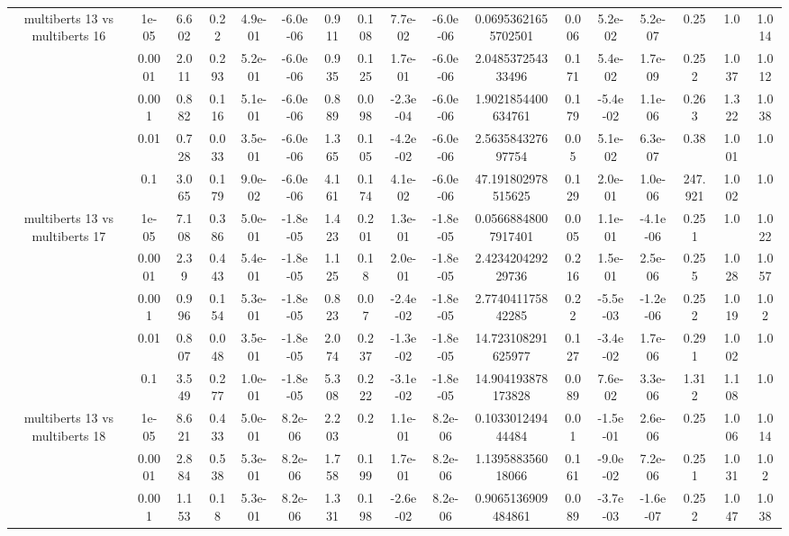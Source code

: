 \begin{tabular}{|c|c|c|c|c|c|c|c|c|c|c|c|c|c|c|c|c|}
\hline
\multirow{5}{*}{multiberts 13 vs multiberts 16} & 1e-05 & 6.602 & 0.22 & 4.9e-01 & -6.0e-06 & 0.911 & 0.108 & 7.7e-02 & -6.0e-06 & 0.06953621655702501 & 0.006 & 5.2e-02 & 5.2e-07 & 0.25 & 1.0 & 1.014 \\
 & 0.0001 & 2.011 & 0.293 & 5.2e-01 & -6.0e-06 & 0.935 & 0.125 & 1.7e-01 & -6.0e-06 & 2.048537254333496 & 0.171 & 5.4e-02 & 1.7e-09 & 0.252 & 1.037 & 1.012 \\
 & 0.001 & 0.882 & 0.116 & 5.1e-01 & -6.0e-06 & 0.889 & 0.098 & -2.3e-04 & -6.0e-06 & 1.9021854400634761 & 0.179 & -5.4e-02 & 1.1e-06 & 0.263 & 1.322 & 1.038 \\
 & 0.01 & 0.728 & 0.033 & 3.5e-01 & -6.0e-06 & 1.365 & 0.105 & -4.2e-02 & -6.0e-06 & 2.563584327697754 & 0.05 & 5.1e-02 & 6.3e-07 & 0.38 & 1.001 & 1.0 \\
 & 0.1 & 3.065 & 0.179 & 9.0e-02 & -6.0e-06 & 4.161 & 0.174 & 4.1e-02 & -6.0e-06 & 47.191802978515625 & 0.129 & 2.0e-01 & 1.0e-06 & 247.921 & 1.002 & 1.0 \\
\hline
\multirow{5}{*}{multiberts 13 vs multiberts 17} & 1e-05 & 7.108 & 0.386 & 5.0e-01 & -1.8e-05 & 1.423 & 0.201 & 1.3e-01 & -1.8e-05 & 0.05668848007917401 & 0.005 & 1.1e-01 & -4.1e-06 & 0.251 & 1.0 & 1.022 \\
 & 0.0001 & 2.39 & 0.443 & 5.4e-01 & -1.8e-05 & 1.125 & 0.18 & 2.0e-01 & -1.8e-05 & 2.423420429229736 & 0.216 & 1.5e-01 & 2.5e-06 & 0.255 & 1.028 & 1.057 \\
 & 0.001 & 0.996 & 0.154 & 5.3e-01 & -1.8e-05 & 0.823 & 0.07 & -2.4e-02 & -1.8e-05 & 2.774041175842285 & 0.22 & -5.5e-03 & -1.2e-06 & 0.252 & 1.019 & 1.02 \\
 & 0.01 & 0.807 & 0.048 & 3.5e-01 & -1.8e-05 & 2.074 & 0.237 & -1.3e-02 & -1.8e-05 & 14.723108291625977 & 0.127 & -3.4e-02 & 1.7e-06 & 0.291 & 1.002 & 1.0 \\
 & 0.1 & 3.549 & 0.277 & 1.0e-01 & -1.8e-05 & 5.308 & 0.222 & -3.1e-02 & -1.8e-05 & 14.904193878173828 & 0.089 & 7.6e-02 & 3.3e-06 & 1.312 & 1.108 & 1.0 \\
\hline
\multirow{5}{*}{multiberts 13 vs multiberts 18} & 1e-05 & 8.621 & 0.433 & 5.0e-01 & 8.2e-06 & 2.203 & 0.2 & 1.1e-01 & 8.2e-06 & 0.103301249444484 & 0.01 & -1.5e-01 & 2.6e-06 & 0.25 & 1.006 & 1.014 \\
 & 0.0001 & 2.884 & 0.538 & 5.3e-01 & 8.2e-06 & 1.758 & 0.199 & 1.7e-01 & 8.2e-06 & 1.139588356018066 & 0.161 & -9.0e-02 & 7.2e-06 & 0.251 & 1.031 & 1.02 \\
 & 0.001 & 1.153 & 0.18 & 5.3e-01 & 8.2e-06 & 1.331 & 0.198 & -2.6e-02 & 8.2e-06 & 0.9065136909484861 & 0.089 & -3.7e-03 & -1.6e-07 & 0.252 & 1.047 & 1.038 \\

\end{tabular}
